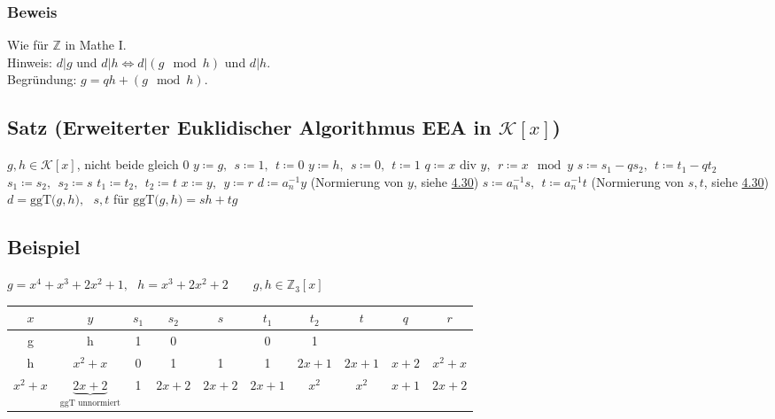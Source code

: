 \documentclass[a4paper, 12pt,titlepage, pdf, headsepline]{scrartcl}
\newcommand{\Z}{\mathds{Z}}
\newcommand{\K}{\mathcal{K}}
\newcommand{\ggT}[1]{\textrm{ggT($#1$)}}
\renewcommand{\div}{\textrm{  div }}
\renewcommand{\>}{\rightarrow}
\renewcommand{\*}{\cdot}
\begin{document}
		      	\subsubsection*{Beweis}
		      	Wie für $\Z$ in Mathe I.\\
		      	Hinweis: $d\vert g$ und $d\vert h\Leftrightarrow d\vert (g\mod h)$ und $d\vert h$.\\
		      	Begründung: $g=qh+(g\mod h)$.
		      	\subsection{Satz (Erweiterter Euklidischer Algorithmus EEA  in $\K[x]$)}
		      	\label{4.33}
		      	\begin{algorithmic}[1]
		      		\algrenewcommand{}
		      		\algrenewcommand{}
		      		\Statex
		      		\Require $g,h\in \K[x]$, nicht beide gleich 0
		      		\State $y\coloneqq g,~~s\coloneqq 1,~~t\coloneqq0$
		      		\EndIf
		      		\State $y\coloneqq h,~~s\coloneqq 0,~~t\coloneqq1$
		      		\EndIf
		      		\State $q\coloneqq x\div y,~~r\coloneqq x\mod y$
		      		\State $s\coloneqq s_1-qs_2,~~t\coloneqq t_1-qt_2$
		      		\State $s_1\coloneqq s_2,~~s_2\coloneqq s$
		      		\State $t_1\coloneqq t_2,~~t_2\coloneqq t$
		      		\State $x\coloneqq y,~~y\coloneqq r$
		      		\EndWhile
		      		\EndIf
		      		\State $d\coloneqq a^{-1}_ny$ (Normierung von $y$, siehe \hyperref[4.30]{4.30})
		      		\State $s\coloneqq a^{-1}_ns,~~t\coloneqq a^{-1}_nt$ (Normierung von $s,t$, siehe \hyperref[4.30]{4.30})
		      		\Ensure $d=\ggT{g,h},~~~s,t$ für $\ggT{g,h}=sh+tg$
		      	\end{algorithmic}
		      	\subsection{Beispiel}
		      	$g = x^4 + x^3 + 2x^2 +1,~~~ h = x^3 + 2x^2 + 2\qquad  g,h \in \mathds{Z}_3[x]$\\			
		      	\begin{tabular}{c | c | c | c | c | c | c | c | c | c }
		      		$x$      & $y$                                           & $s_1$ & $s_2$  & $s$    & $t_1$  & $t_2$  & $t$    & $q$   & $r$      \\ \hline
		      		g        & h                                             & 1     & 0      &        & 0      & 1      &        &       &          \\ 
		      		h        & $x^2 +x$                                      & 0     & 1      & 1      & 1      & $2x+1$ & $2x+1$ & $x+2$ & $x^2 +x$ \\
		      		$x^2 +x$ & $\underbrace{2x+2}_{\textrm{ggT unnormiert}}$ & 1     & $2x+2$ & $2x+2$ & $2x+1$ & $x^2$  & $x^2$  & $x+1$ & $2x +2$  \\
		      	\end{tabular} \\	
\end{document}
